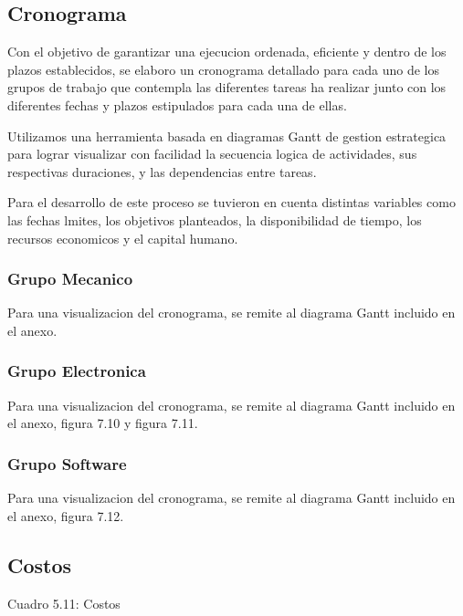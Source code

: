   \subsection{Cronograma}
    Con el objetivo de garantizar una ejecucion ordenada, eficiente y dentro de los plazos
    establecidos, se elaboro un cronograma detallado para cada uno de los grupos de trabajo que
    contempla las diferentes tareas ha realizar junto con los diferentes fechas y plazos estipulados
    para cada una de ellas.

    Utilizamos una herramienta basada en diagramas Gantt de gestion estrategica para lograr
    visualizar con facilidad la secuencia logica de actividades, sus respectivas duraciones, y las
    dependencias entre tareas.

    Para el desarrollo de este proceso se tuvieron en cuenta distintas variables como las fechas
    lmites, los objetivos planteados, la disponibilidad de tiempo, los recursos economicos y el
    capital humano.

    \subsubsection{Grupo Mecanico}
    Para una visualizacion del cronograma, se remite al diagrama Gantt incluido en el anexo.
    \subsubsection{Grupo Electronica}
    Para una visualizacion del cronograma, se remite al diagrama Gantt incluido en el anexo,
    figura 7.10 y figura 7.11.
    \subsubsection{Grupo Software}
    Para una visualizacion del cronograma, se remite al diagrama Gantt incluido en el anexo,
    figura 7.12.

  \subsection{Costos}

    Cuadro 5.11: Costos
